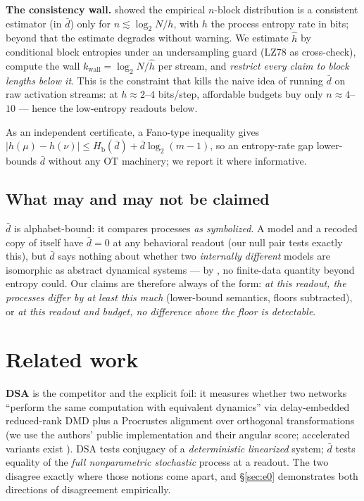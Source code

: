\documentclass[11pt]{article}
\newcommand{\dbar}{\bar d}
\newcommand{\Hb}{H_{\mathrm b}}
\begin{document}
\textbf{The consistency wall.} \citet{marton1994entropy} showed the empirical
$n$-block distribution is a consistent estimator (in $\dbar$) only for
$n \lesssim \log_2 N/h$, with $h$ the process entropy rate in bits; beyond that the
estimate degrades without warning. We estimate $\hat h$ by conditional block entropies
under an undersampling guard (LZ78 as cross-check), compute the wall
$k_{\mathrm{wall}} = \log_2 N/\hat h$ per stream, and \emph{restrict every claim to
block lengths below it}. This is the constraint that kills the naive idea of running
$\dbar$ on raw activation streams: at $h \approx 2$--$4$ bits/step, affordable budgets
buy only $n \approx 4$--$10$ --- hence the low-entropy readouts below.

As an independent certificate, a Fano-type inequality
\citep[cf.][]{shields1996ergodic} gives $|h(\mu) - h(\nu)| \le \Hb(\dbar) + \dbar
\log_2(m{-}1)$, so an entropy-rate gap lower-bounds $\dbar$ without any OT machinery;
we report it where informative.

\subsection{What may and may not be claimed}\label{sec:limits-claims}
$\dbar$ is alphabet-bound: it compares processes \emph{as symbolized}. A model and a
recoded copy of itself have $\dbar = 0$ at any behavioral readout (our null pair
tests exactly this), but $\dbar$ says nothing about whether two \emph{internally
different} models are isomorphic as abstract dynamical systems --- by
\citet{ornstein2007entropy}, no finite-data quantity beyond entropy could. Our claims
are therefore always of the form: \emph{at this readout, the processes differ by at
least this much} (lower-bound semantics, floors subtracted), or \emph{at this readout
and budget, no difference above the floor is detectable}.

\section{Related work}\label{sec:related}

\textbf{DSA} \citep{ostrow2023beyond} is the competitor and the explicit foil: it
measures whether two networks ``perform the same computation with equivalent
dynamics'' via delay-embedded reduced-rank DMD plus a Procrustes alignment over
orthogonal transformations (we use the authors' public implementation and their
angular score; accelerated variants exist \citep{behrad2025fast}). DSA tests conjugacy
of a \emph{deterministic linearized} system; $\dbar$ tests equality of the \emph{full
nonparametric stochastic} process at a readout. The two disagree exactly where those
notions come apart, and \S\ref{sec:e0} demonstrates both directions of disagreement
empirically.
\end{document}
